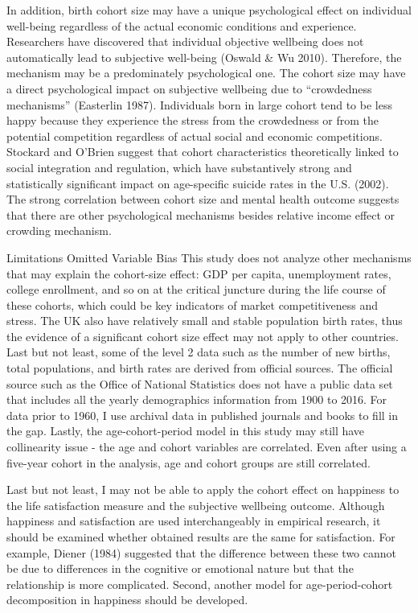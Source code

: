In addition, birth cohort size may have a unique psychological effect on individual well-being regardless of the actual economic conditions and experience. Researchers have discovered that individual objective wellbeing does not automatically lead to subjective well-being (Oswald & Wu 2010). Therefore, the mechanism may be a predominately psychological one. The cohort size may have a direct psychological impact on subjective wellbeing due to “crowdedness mechanisms” (Easterlin 1987). Individuals born in large cohort tend to be less happy because they experience the stress from the crowdedness or from the potential competition regardless of actual social and economic competitions. Stockard and O’Brien suggest that cohort characteristics theoretically linked to social integration and regulation, which have substantively strong and statistically significant impact on age-specific suicide rates in the U.S. (2002). The strong correlation between cohort size and mental health outcome suggests that there are other psychological mechanisms besides relative income effect or crowding mechanism.

Limitations
Omitted Variable Bias
This study does not analyze other mechanisms that may explain the cohort-size effect: GDP per capita, unemployment rates, college enrollment, and so on at the critical juncture during the life course of these cohorts, which could be key indicators of market competitiveness and stress. The UK also have relatively small and stable population birth rates, thus the evidence of a significant cohort size effect may not apply to other countries. Last but not least, some of the level 2 data such as the number of new births, total populations, and birth rates are derived from official sources. The official source such as the Office of National Statistics does not have a public data set that includes all the yearly demographics information from 1900 to 2016. For data prior to 1960, I use archival data in published journals and books to fill in the gap. Lastly, the age-cohort-period model in this study may still have collinearity issue - the age and cohort variables are correlated. Even after using a five-year cohort in the analysis, age and cohort groups are still correlated.

Last but not least, I may not be able to apply the cohort effect on happiness to the life satisfaction measure and the subjective wellbeing outcome. Although happiness and satisfaction are used interchangeably in empirical research, it should be examined whether obtained results are the same for satisfaction. For example, Diener (1984) suggested that the difference between these two cannot be due to differences in the cognitive or emotional nature but that the relationship is more complicated. Second, another model for age-period-cohort decomposition in happiness should be developed.

